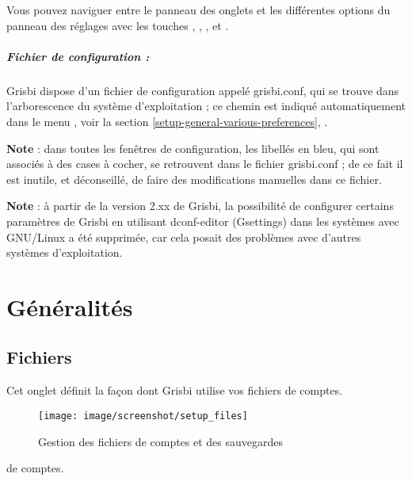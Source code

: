
Vous pouvez naviguer entre le panneau des onglets et les différentes options du panneau des réglages avec les touches , , ,  et .



\subparagraph{Fichier de configuration :\label{setup-conffile}}


Grisbi dispose d'un fichier de configuration appelé grisbi.conf, qui se trouve dans l'arborescence du système d'exploitation ; ce chemin est indiqué automatiquement dans le menu , voir la section \vref{setup-general-various-preferences}, .


\textbf{Note} : dans toutes les fenêtres de configuration, les libellés en bleu, qui sont associés à des cases à cocher, se retrouvent dans le fichier grisbi.conf ; de ce fait il est inutile, et déconseillé, de faire des modifications manuelles dans ce fichier.


\textbf{Note} : à partir de la version 2.xx de Grisbi, la possibilité de configurer certains paramètres de Grisbi en utilisant dconf-editor (Gsettings) dans les systèmes avec GNU/Linux a été supprimée, car cela posait des problèmes avec d'autres systèmes d'exploitation.


\section{Généralités\label{setup-general}}


\subsection{Fichiers\label{setup-general-files}}

Cet onglet définit la façon dont Grisbi utilise vos fichiers \ifIllustration de comptes.

\begin{figure}[htbp]
\begin{center}
\texttt{[image: image/screenshot/setup\_files]}
\end{center}
\caption{Gestion des fichiers de comptes et des sauvegardes}
\label{setup-files-img}
\end{figure}
\else de comptes.
\fi


